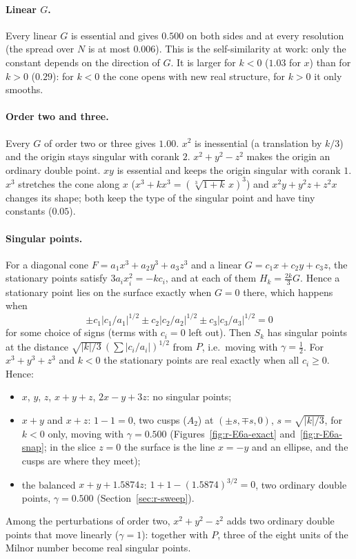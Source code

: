 \documentclass[12pt, a4paper]{article}
\theoremstyle{plain}
\theoremstyle{definition}
\theoremstyle{remark}
\theoremstyle{definition}
\begin{document}
\paragraph{Linear $G$.} Every linear $G$ is essential and gives $0.500$ on both
sides and at every resolution (the spread over $N$ is at most $0.006$). This is the
self-similarity at work: only the constant depends on the direction of $G$. It is
larger for $k<0$ ($1.03$ for $x$) than for $k>0$ ($0.29$): for $k<0$ the cone opens
with new real structure, for $k>0$ it only smooths.

\paragraph{Order two and three.} Every $G$ of order two or three gives $1.00$. $x^2$
is inessential (a translation by $k/3$) and the origin stays singular with corank
$2$. $x^2+y^2-z^2$ makes the origin an ordinary double point. $xy$ is essential and
keeps the origin singular with corank $1$. $x^3$ stretches the cone along $x$
($x^3+kx^3=(\sqrt[3]{1+k}\,x)^3$) and $x^2y+y^2z+z^2x$ changes its shape; both keep the
type of the singular point and have tiny constants ($0.05$).

\paragraph{Singular points.} For a diagonal cone $F=a_1x^3+a_2y^3+a_3z^3$ and a
linear $G=c_1x+c_2y+c_3z$, the stationary points satisfy $3a_ix_i^2=-kc_i$, and at
each of them $H_k=\tfrac{2k}{3}G$. Hence a stationary point lies on the surface
exactly when $G=0$ there, which happens when
\[
\pm c_1|c_1/a_1|^{1/2}\pm c_2|c_2/a_2|^{1/2}\pm c_3|c_3/a_3|^{1/2}=0
\]
for some choice of signs (terms with $c_i=0$ left out). Then $S_k$ has singular points
at the distance $\sqrt{|k|/3}\,(\sum|c_i/a_i|)^{1/2}$ from $P$, i.e.\ moving with
$\gamma=\tfrac12$. For $x^3+y^3+z^3$ and $k<0$ the stationary points are real exactly
when all $c_i\ge0$. Hence:
\begin{itemize}
    \item $x$, $y$, $z$, $x+y+z$, $2x-y+3z$: no singular points;
    \item $x+y$ and $x+z$: $1-1=0$, two cusps ($A_2$) at $(\pm s,\mp s,0)$,
          $s=\sqrt{|k|/3}$, for $k<0$ only, moving with $\gamma=0.500$
          (Figures~\ref{fig:r-E6a-exact} and~\ref{fig:r-E6a-snap}; in the slice
          $z=0$ the surface is the line $x=-y$ and an ellipse, and the cusps are
          where they meet);
    \item the balanced $x+y+1.5874z$: $1+1-(1.5874)^{3/2}=0$, two ordinary double
          points, $\gamma=0.500$ (Section~\ref{sec:r-sweep}).
\end{itemize}
Among the perturbations of order two, $x^2+y^2-z^2$ adds two ordinary double points
that move linearly ($\gamma=1$): together with $P$, three of the eight units of the
Milnor number become real singular points.
\clearpage
\end{document}
